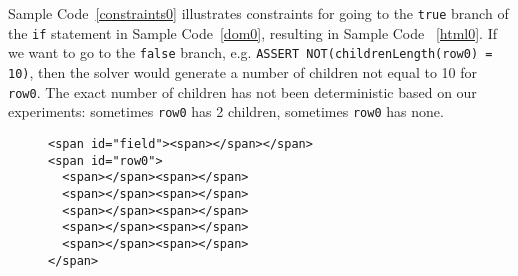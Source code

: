 Sample Code~\ref{constraints0} illustrates constraints for going to the {\tt true} branch of the {\tt if} statement in Sample Code~\ref{dom0}, resulting in Sample Code ~\ref{html0}.  
If we want to go to the {\tt false} branch, e.g. {\tt ASSERT NOT(childrenLength(row0) = 10)}, then the solver would generate a number of children not equal to 10 for {\tt row0}.  The exact number of children has not been deterministic based on our experiments: sometimes {\tt row0} has 2 children, sometimes {\tt row0} has none.  

\begin{figure}
\begin{lstlisting}[caption=Example HTML generated by the DOM solver based on the constraints defined in Sample Code ~\ref{constraints0}.  Note that {\tt row0} is not a child of {\tt field} because the source code in Sample Code \ref{dom0} did not require the rows to be children of {\tt field}.,label=html0]  
<span id="field"><span></span></span>
<span id="row0">
  <span></span><span></span>
  <span></span><span></span>
  <span></span><span></span>
  <span></span><span></span>
  <span></span><span></span>
</span>
\end{lstlisting}
\end{figure}
